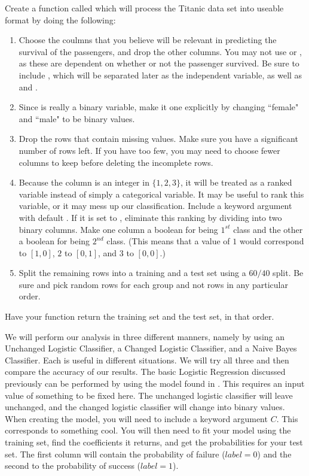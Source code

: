 \begin{problem}
Create a function called  which will process the Titanic data set into useable format by doing the following:
\begin{enumerate}
\item Choose the coulmns that you believe will be relevant in predicting the survival of the passengers, and drop the other columns.  You may not use  or , as these are dependent on whether or not the passenger survived.  Be sure to include , which will be separated later as the independent variable, as well as  and .
\item Since  is really a binary variable, make it one explicitly by changing ``female" and ``male" to be binary values.
\item Drop the rows that contain missing values.  Make sure you have a significant number of rows left.  If you have too few, you may need to choose fewer columns to keep before deleting the incomplete rows.
\item Because the  column is an integer in $\{1, 2, 3\}$, it will be treated as a ranked variable instead of simply a categorical variable.  It may be useful to rank this variable, or it may mess up our classification.  Include a keyword argument  with default .  If it is set to , eliminate this ranking by dividing  into two binary columns.  Make one column a boolean for being $1^{st}$ class and the other a boolean for being $2^{nd}$ class. (This means that a value of $1$ would correspond to $[1, 0]$, $2$ to $[0, 1]$, and $3$ to $[0, 0]$.)
\item Split the remaining rows into a training and a test set using a $60/40$ split.  Be sure and pick random rows for each group and not rows in any particular order.
\end{enumerate}
Have your function return the training set and the test set, in that order.
\end{problem}

We will perform our analysis in three different manners, namely by using an Unchanged Logistic Classifier, a Changed Logistic Classifier, and a Naive Bayes Classifier.  Each is useful in different situations.  We will try all three and then compare the accuracy of our results.
The basic Logistic Regression discussed previously can be performed by using the  model found in .  This requires an input value of something to be fixed here.  The unchanged logistic classifier will leave  unchanged, and the changed logistic classifier will change  into binary values.  When creating the model, you will need to include a keyword argument $C$.  This corresponds to something cool.  You will then need to fit your model using the training set, find the coefficients it returns, and get the probabilities for your test set.  The first column will contain the probability of failure ($label = 0$) and the second to the probability of success ($label = 1$).

